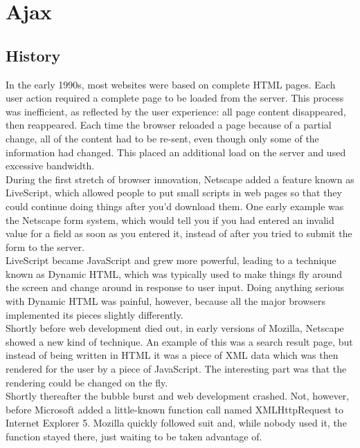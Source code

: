 \section{Ajax}
\label{sec:ajax}
	
\subsection{History}
In the early 1990s, most websites were based on complete HTML pages. Each user action required a complete page to be loaded from the server. This process was inefficient, as reflected by the user experience: all page content disappeared, then reappeared. Each time the browser reloaded a page because of a partial change, all of the content had to be re-sent, even though only some of the information had changed. This placed an additional load on the server and used excessive bandwidth.\\

During the first stretch of browser innovation, Netscape added a feature known as LiveScript, which allowed people to put small scripts in web pages so that they could continue doing things after you'd download them. One early example was the Netscape form system, which would tell you if you had entered an invalid value for a field as soon as you entered it, instead of after you tried to submit the form to the server.\\

LiveScript became JavaScript and grew more powerful, leading to a technique known as Dynamic HTML, which was typically used to make things fly around the screen and change around in response to user input. Doing anything serious with Dynamic HTML was painful, however, because all the major browsers implemented its pieces slightly differently.\\

Shortly before web development died out, in early versions of Mozilla, Netscape showed a new kind of technique. An example of this was a search result page, but instead of being written in HTML it was a piece of XML data which was then rendered for the user by a piece of JavaScript. The interesting part was that the rendering could be changed on the fly.\\

Shortly thereafter the bubble burst and web development crashed. Not, however, before Microsoft added a little-known function call named XMLHttpRequest to Internet Explorer 5. Mozilla quickly followed suit and, while nobody used it, the function stayed there, just waiting to be taken advantage of.\\

